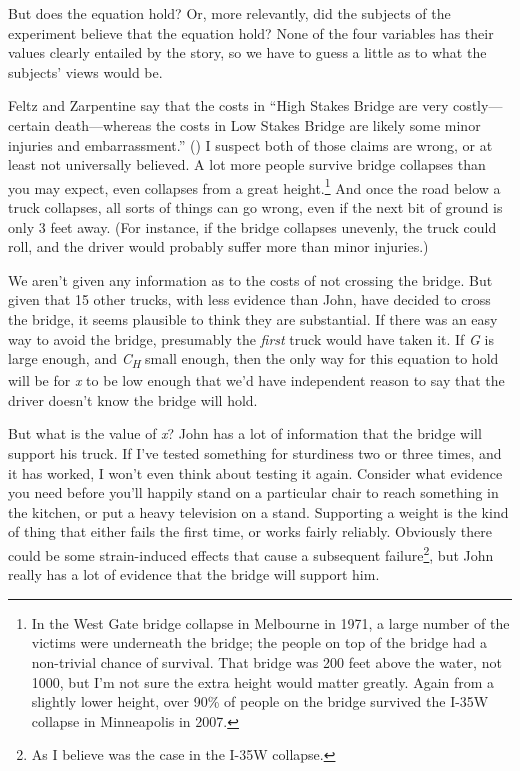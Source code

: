 \documentclass[
  11pt,
  letterpaper,
  DIV=11,
  numbers=noendperiod,
  twoside]{scrartcl}
\begin{document}
But does the equation hold? Or, more relevantly, did the subjects of the
experiment believe that the equation hold? None of the four variables
has their values clearly entailed by the story, so we have to guess a
little as to what the subjects' views would be.

Feltz and Zarpentine say that the costs in ``High Stakes Bridge are very
costly---certain death---whereas the costs in Low Stakes Bridge are
likely some minor injuries and embarrassment.''
() I
suspect both of those claims are wrong, or at least not universally
believed. A lot more people survive bridge collapses than you may
expect, even collapses from a great height.\footnote{In the West Gate
  bridge collapse in Melbourne in 1971, a large number of the victims
  were underneath the bridge; the people on top of the bridge had a
  non-trivial chance of survival. That bridge was 200 feet above the
  water, not 1000, but I'm not sure the extra height would matter
  greatly. Again from a slightly lower height, over 90\% of people on
  the bridge survived the I-35W collapse in Minneapolis in 2007.} And
once the road below a truck collapses, all sorts of things can go wrong,
even if the next bit of ground is only 3 feet away. (For instance, if
the bridge collapses unevenly, the truck could roll, and the driver
would probably suffer more than minor injuries.)

We aren't given any information as to the costs of not crossing the
bridge. But given that 15 other trucks, with less evidence than John,
have decided to cross the bridge, it seems plausible to think they are
substantial. If there was an easy way to avoid the bridge, presumably
the \emph{first} truck would have taken it. If \emph{G} is large enough,
and \emph{C\textsubscript{H}} small enough, then the only way for this
equation to hold will be for \emph{x} to be low enough that we'd have
independent reason to say that the driver doesn't know the bridge will
hold.

But what is the value of \emph{x}? John has a lot of information that
the bridge will support his truck. If I've tested something for
sturdiness two or three times, and it has worked, I won't even think
about testing it again. Consider what evidence you need before you'll
happily stand on a particular chair to reach something in the kitchen,
or put a heavy television on a stand. Supporting a weight is the kind of
thing that either fails the first time, or works fairly reliably.
Obviously there could be some strain-induced effects that cause a
subsequent failure\footnote{As I believe was the case in the I-35W
  collapse.}, but John really has a lot of evidence that the bridge will
support him.
\end{document}
